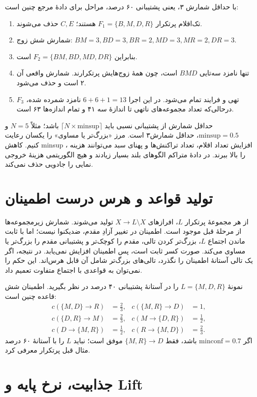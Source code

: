\documentclass[12pt,a4paper,oneside]{report}
\begin{document}
با حداقل شمارش ۳، یعنی پشتیبانی ۶۰ درصد، مراحل برای دادهٔ مرجع چنین است:
\begin{enumerate}
\item تک‌اقلام پرتکرار $F_1=\{B,M,D,R\}$ هستند؛ $C,E$ حذف می‌شوند.
\item شمارش شش زوج: $BM=3,BD=3,BR=2,MD=3,MR=2,DR=3$.
\item بنابراین $F_2=\{BM,BD,MD,DR\}$ است.
\item تنها نامزد سه‌تایی $BMD$ است، چون همهٔ زوج‌هایش پرتکرارند. شمارش واقعی آن ۲ است و حذف می‌شود.
\item $F_3$ تهی و فرایند تمام می‌شود. در این اجرا $6+6+1=13$ نامزد شمرده شده، درحالی‌که تعداد مجموعه‌های ناتهی تا اندازهٔ سه ۴۱ و تمام اندازه‌ها ۶۳ است.
\end{enumerate}

حداقل شمارش از پشتیبانی نسبی باید $\lceil N\times\mathrm{minsup}\rceil$ باشد؛ مثلاً $N=5$ و $\mathrm{minsup}=0.5$، حداقل شمارش۳ است. مرز «بزرگ‌تر یا مساوی» را یکسان رعایت کنیم. کاهش minsup ، افزایش تعداد اقلام، تعداد تراکنش‌ها و پهنای سبد می‌توانند هزینه را بالا ببرند. در دادهٔ متراکم الگوهای بلند بسیار زیادند و هیچ الگوریتمی هزینهٔ خروجی نمایی را جادویی حذف نمی‌کند.

\section{تولید قواعد و هرس درست اطمینان}

از هر مجموعهٔ پرتکرار $L$، افرازهای $X\to L\setminus X$ تولید می‌شوند. شمارش زیرمجموعه‌ها از مرحلهٔ قبل موجود است. اطمینان در تغییر آزادِ مقدم، ضدیکنوا نیست؛ اما با ثابت ماندن اجتماع $L$، بزرگ‌تر کردن تالی، مقدم را کوچک‌تر و پشتیبانی مقدم را بزرگ‌تر یا مساوی می‌کند. صورت کسر ثابت است، پس اطمینان افزایش نمی‌یابد. در نتیجه، اگر یک تالی آستانهٔ اطمینان را نگذرد، تالی‌های بزرگ‌تر شامل آن قابل هرس‌اند. این حکم را نمی‌توان به قواعدی با اجتماع متفاوت تعمیم داد.

نمونهٔ $L=\{M,D,R\}$ را در آستانهٔ پشتیبانی ۴۰ درصد در نظر بگیرید. اطمینان شش قاعده چنین است:
\begin{align*}
c(\{M,D\}\to R)&=\frac23,& c(\{M,R\}\to D)&=1,\\
c(\{D,R\}\to M)&=\frac23,& c(M\to\{D,R\})&=\frac12,\\
c(D\to\{M,R\})&=\frac12,& c(R\to\{M,D\})&=\frac23.
\end{align*}
اگر $\mathrm{minconf}=0.7$ باشد، فقط $\{M,R\}\to D$ موفق است؛ نباید $L$ را با آستانهٔ ۶۰ درصد مثال قبل پرتکرار معرفی کرد.

\section{جذابیت، نرخ پایه و Lift}
\end{document}
